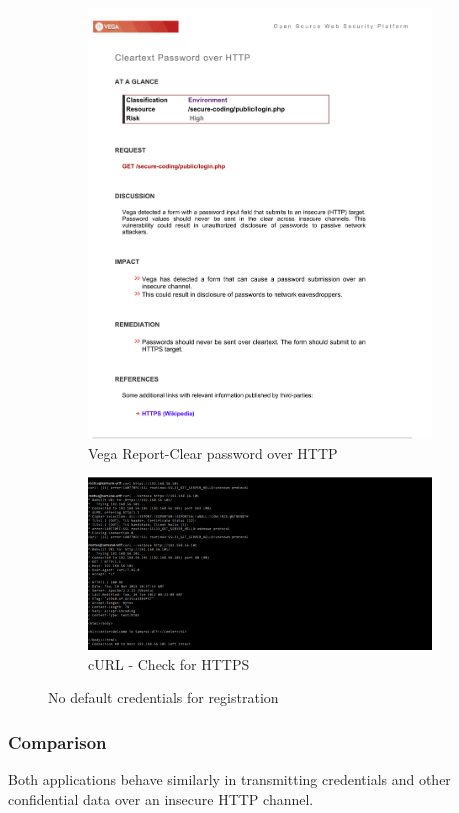 \begin{figure}[ht]
	\centering
	\begin{subfigure}{.45\textwidth}
		\centering
		\includegraphics[width=.9\linewidth]{figures/OTG-AUTHN-001_1.png}
		\caption{Vega Report-Clear password over HTTP}
	\end{subfigure}\hfill%
	\begin{subfigure}{.45\textwidth}
		\centering
		\includegraphics[width=.8\linewidth]{figures/OTG-AUTHN-001_2.png}
		\caption{cURL - Check for HTTPS}
	\end{subfigure}
	\caption{No default credentials for registration}
	\label{fig:credentials_over_http}
\end{figure}

\subsubsection{Comparison}
Both applications behave similarly in transmitting credentials and other confidential data over an insecure HTTP channel.
\clearpage